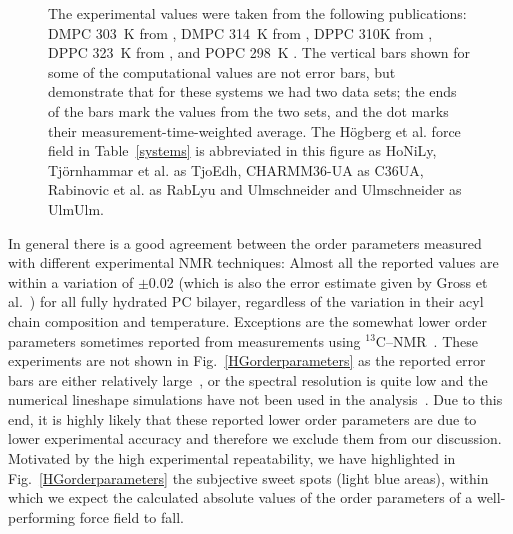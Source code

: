 \documentclass[pre,aps,floatfix,authordate1-4,twocolumn]{revtex4-1}
\begin{document}
\begin{figure}[]
{  The experimental values were taken from the following publications: DMPC 303~K from \cite{gross97}, DMPC 314~K from \cite{dvinskikh05a}, DPPC 310K from \cite{gally75}, 
  DPPC 323~K from \cite{akutsu81}, and POPC 298~K \cite{ferreira13}.
  The vertical bars shown for some of the computational values are not error bars, but demonstrate that for 
  these systems we had two data sets; the ends of the bars mark the values from the two sets, and the dot marks their measurement-time-weighted average. 
  The H{\"o}gberg et al. force field in Table~\ref{systems} is abbreviated in this figure as HoNiLy, Tj{\"o}rnhammar et al. as TjoEdh, CHARMM36-UA as C36UA,
  Rabinovic et al. as RabLyu and Ulmschneider and Ulmschneider as UlmUlm.
} 
\end{figure}

In general there is a good agreement between the order parameters measured with different experimental NMR techniques: Almost all the 
reported values are within a variation of $\pm$0.02 (which is also the error estimate given by Gross et al.~\cite{gross97}) 
for all fully hydrated PC bilayer, regardless of the variation in their acyl chain composition and temperature.
Exceptions are the somewhat lower order parameters sometimes reported from measurements using $^{13}$C--NMR~\cite{hong95a,hong95b,warschawski05}.
These experiments are not shown in Fig.~\ref{HGorderparameters} as the reported error bars are either relatively large~\cite{hong95a,hong95b}, 
or the spectral resolution is quite low and the numerical lineshape simulations have not been used in the analysis~\cite{warschawski05}.
Due to this end, it is highly likely that these reported lower order parameters are due to lower experimental 
accuracy and therefore we exclude them from our discussion. 
Motivated by the high experimental repeatability, we have highlighted in 
Fig.~\ref{HGorderparameters} the subjective sweet spots (light blue areas), within which we expect the calculated absolute 
values of the order parameters of a well-performing force field to fall.

\end{document}
